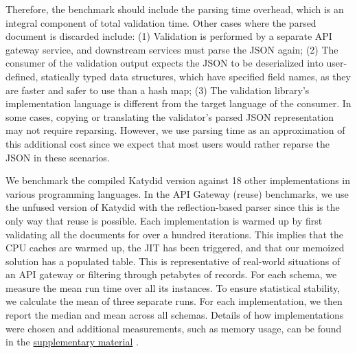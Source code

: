 \documentclass[runningheads]{llncs}
\newcommand{\supplementarymaterial}{%
  \hyperref[supplementary_material]{supplementary material}\xspace%
}
\newcommand{\JSON}{\ac{JSON}\xspace}
\begin{document}
Therefore, the benchmark should include the parsing time overhead, which is an integral component of total validation time.
Other cases where the parsed document is discarded include: (1) Validation is performed by a separate API gateway service, and downstream services must parse the \JSON again; (2) The consumer of the validation output expects the \JSON to be deserialized into user-defined, statically typed data structures, which have specified field names, as they are faster and safer to use than a hash map; (3) The validation library's implementation language is different from the target language of the consumer.
In some cases, copying or translating the validator's parsed \JSON representation may not require reparsing.
However, we use parsing time as an approximation of this additional cost since we expect that most users would rather reparse the \JSON in these scenarios.

We benchmark the compiled Katydid version against 18 other implementations in various programming languages.
In the API Gateway (reuse) benchmarks, we use the unfused version of Katydid with the reflection-based parser since this is the only way that reuse is possible.
Each implementation is warmed up by first validating all the documents for over a hundred iterations.
This implies that the CPU caches are warmed up, the JIT has been triggered, and that our memoized solution has a populated table.
This is representative of real-world situations of an API gateway or filtering through petabytes of records.
For each schema, we measure the mean run time over all its instances.
To ensure statistical stability, we calculate the mean of three separate runs.
For each implementation, we then report the median and mean across all schemas.
Details of how implementations were chosen and additional measurements, such as memory usage, can be found in the \supplementarymaterial.
\end{document}
